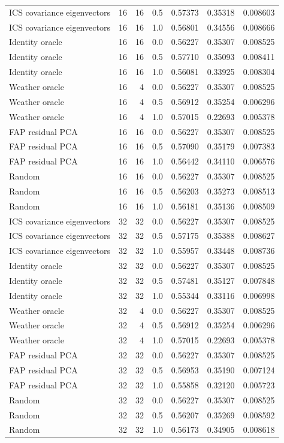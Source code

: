 \begin{tabular}{lrrrrrr}
ICS covariance eigenvectors & 16 & 16 & 0.5 & 0.57373 & 0.35318 & 0.008603 \\
ICS covariance eigenvectors & 16 & 16 & 1.0 & 0.56801 & 0.34556 & 0.008666 \\
Identity oracle & 16 & 16 & 0.0 & 0.56227 & 0.35307 & 0.008525 \\
Identity oracle & 16 & 16 & 0.5 & 0.57710 & 0.35093 & 0.008411 \\
Identity oracle & 16 & 16 & 1.0 & 0.56081 & 0.33925 & 0.008304 \\
Weather oracle & 16 & 4 & 0.0 & 0.56227 & 0.35307 & 0.008525 \\
Weather oracle & 16 & 4 & 0.5 & 0.56912 & 0.35254 & 0.006296 \\
Weather oracle & 16 & 4 & 1.0 & 0.57015 & 0.22693 & 0.005378 \\
FAP residual PCA & 16 & 16 & 0.0 & 0.56227 & 0.35307 & 0.008525 \\
FAP residual PCA & 16 & 16 & 0.5 & 0.57090 & 0.35179 & 0.007383 \\
FAP residual PCA & 16 & 16 & 1.0 & 0.56442 & 0.34110 & 0.006576 \\
Random & 16 & 16 & 0.0 & 0.56227 & 0.35307 & 0.008525 \\
Random & 16 & 16 & 0.5 & 0.56203 & 0.35273 & 0.008513 \\
Random & 16 & 16 & 1.0 & 0.56181 & 0.35136 & 0.008509 \\
ICS covariance eigenvectors & 32 & 32 & 0.0 & 0.56227 & 0.35307 & 0.008525 \\
ICS covariance eigenvectors & 32 & 32 & 0.5 & 0.57175 & 0.35388 & 0.008627 \\
ICS covariance eigenvectors & 32 & 32 & 1.0 & 0.55957 & 0.33448 & 0.008736 \\
Identity oracle & 32 & 32 & 0.0 & 0.56227 & 0.35307 & 0.008525 \\
Identity oracle & 32 & 32 & 0.5 & 0.57481 & 0.35127 & 0.007848 \\
Identity oracle & 32 & 32 & 1.0 & 0.55344 & 0.33116 & 0.006998 \\
Weather oracle & 32 & 4 & 0.0 & 0.56227 & 0.35307 & 0.008525 \\
Weather oracle & 32 & 4 & 0.5 & 0.56912 & 0.35254 & 0.006296 \\
Weather oracle & 32 & 4 & 1.0 & 0.57015 & 0.22693 & 0.005378 \\
FAP residual PCA & 32 & 32 & 0.0 & 0.56227 & 0.35307 & 0.008525 \\
FAP residual PCA & 32 & 32 & 0.5 & 0.56953 & 0.35190 & 0.007124 \\
FAP residual PCA & 32 & 32 & 1.0 & 0.55858 & 0.32120 & 0.005723 \\
Random & 32 & 32 & 0.0 & 0.56227 & 0.35307 & 0.008525 \\
Random & 32 & 32 & 0.5 & 0.56207 & 0.35269 & 0.008592 \\
Random & 32 & 32 & 1.0 & 0.56173 & 0.34905 & 0.008618 \\
\bottomrule
\end{tabular}
